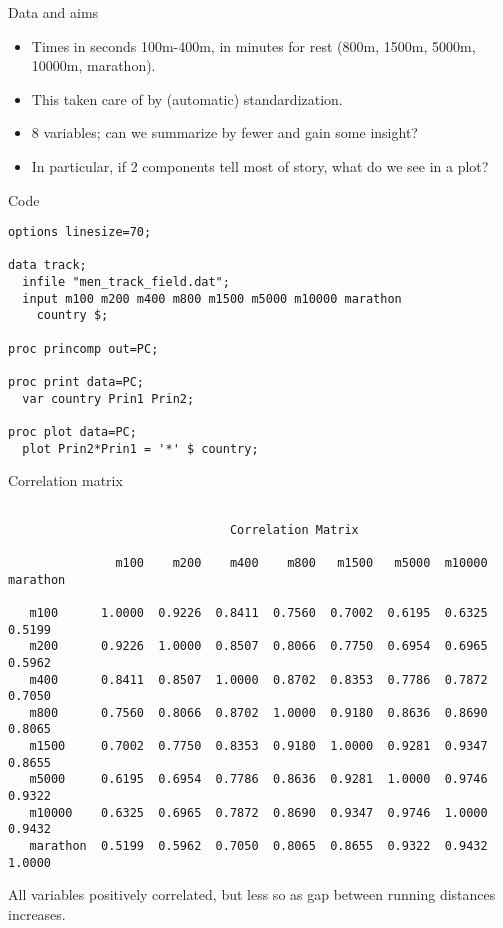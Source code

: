 \documentclass[pdf]{prosper}
\begin{document}
\begin{slide}{Data and aims}

  \begin{itemize}
  \item 
Times in seconds 100m-400m, in minutes for rest (800m, 1500m, 5000m, 10000m, marathon).
\item This taken care of by (automatic) standardization.
\item 8 variables; can we summarize by fewer and gain some insight?
\item In particular, if 2 components tell most of story, what do we see in a plot?

  \end{itemize}

  
\end{slide}


\begin{slide}{Code}

\begin{verbatim}
options linesize=70;

data track;
  infile "men_track_field.dat";
  input m100 m200 m400 m800 m1500 m5000 m10000 marathon 
    country $;

proc princomp out=PC;

proc print data=PC;
  var country Prin1 Prin2;

proc plot data=PC;
  plot Prin2*Prin1 = '*' $ country;

\end{verbatim}
  
\end{slide}

\begin{slide}{Correlation matrix}

{\scriptsize
\begin{verbatim}

                               Correlation Matrix

               m100    m200    m400    m800   m1500   m5000  m10000  marathon

   m100      1.0000  0.9226  0.8411  0.7560  0.7002  0.6195  0.6325    0.5199
   m200      0.9226  1.0000  0.8507  0.8066  0.7750  0.6954  0.6965    0.5962
   m400      0.8411  0.8507  1.0000  0.8702  0.8353  0.7786  0.7872    0.7050
   m800      0.7560  0.8066  0.8702  1.0000  0.9180  0.8636  0.8690    0.8065
   m1500     0.7002  0.7750  0.8353  0.9180  1.0000  0.9281  0.9347    0.8655
   m5000     0.6195  0.6954  0.7786  0.8636  0.9281  1.0000  0.9746    0.9322
   m10000    0.6325  0.6965  0.7872  0.8690  0.9347  0.9746  1.0000    0.9432
   marathon  0.5199  0.5962  0.7050  0.8065  0.8655  0.9322  0.9432    1.0000

\end{verbatim}
}

All variables positively correlated, but less so as gap between running distances increases.
  
\end{slide}
\end{document}
